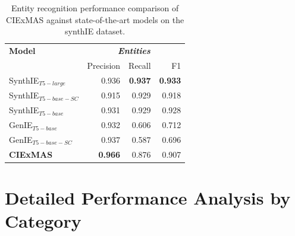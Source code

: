 \documentclass[a4paper,oneside,bibliography=totoc]{scrbook}
\begin{document}
\begin{table}[h]
  \centering
  \begin{tabular}{l|rrr}
    \toprule
    \textbf{Model}         & \multicolumn{3}{c}{\textit{\textbf{Entities}}}                                   \\
                           & Precision                                      & Recall         & F1             \\
    \midrule
    SynthIE$_{T5-large}$   & 0.936                                          & \textbf{0.937} & \textbf{0.933} \\
    SynthIE$_{T5-base-SC}$ & 0.915                                          & 0.929          & 0.918          \\
    SynthIE$_{T5-base}$    & 0.931                                          & 0.929          & 0.928          \\
    GenIE$_{T5-base}$      & 0.932                                          & 0.606          & 0.712          \\
    GenIE$_{T5-base-SC}$   & 0.937                                          & 0.587          & 0.696          \\
    \midrule
    \textbf{CIExMAS}       & \textbf{0.966}                                 & 0.876          & 0.907          \\
    \bottomrule
  \end{tabular}
  \caption{Entity recognition performance comparison of CIExMAS against state-of-the-art models on the synthIE dataset.}
  \label{tab:evaluation_entities}
\end{table}

\newpage

\clearpage
\section{Detailed Performance Analysis by Category}
\end{document}
